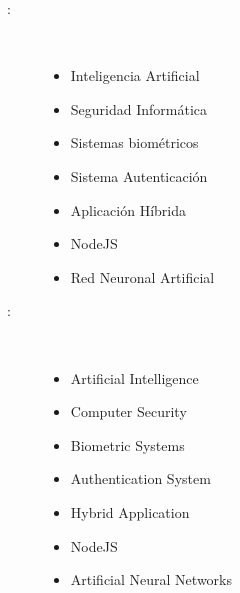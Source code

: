 \begin{multicols}{2}
\begin{description}
\item [\palabraschaveprincipal:] \mbox{} \\[-20pt]
\begin{itemize}
    \item Inteligencia Artificial
    \item Seguridad Informática
    \item Sistemas biométricos
    \item Sistema Autenticación
    \item Aplicación Híbrida
    \item NodeJS
    \item Red Neuronal Artificial
    
\end{itemize}

\end{description}
\begin{description}
\item [\palabraschavesecundaria:] \mbox{} \\[-20pt]
\begin{itemize}
    \item Artificial Intelligence
    \item Computer Security
    \item Biometric Systems
    \item Authentication System
    \item Hybrid Application
    \item NodeJS
    \item Artificial Neural Networks
\end{itemize}
\end{description}
\end{multicols}
